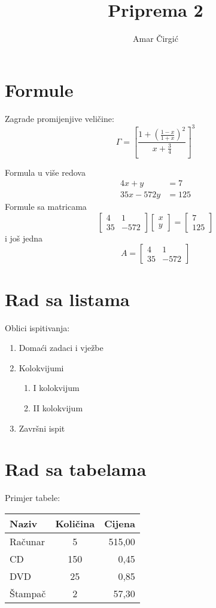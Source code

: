 \documentclass[12pt, twocolumn, a4paper]{article}
\begin{document}
\title{Priprema 2}
\author{Amar Čirgić}
\maketitle
\section{Formule}
Zagrade promijenjive veličine:
$$ \Gamma = \left[ \frac{1+\left( \frac{1-x}{1+x}\right)^2 }{x+\frac{3}{4}}\right]^3 $$

Formula u više redova
\begin{align}
4x+y &= 7 \nonumber \\ 
35x-572y &= 125 \nonumber
\end{align}
Formule sa matricama
$$
\begin{bmatrix}
	4 & 1 \\
	35 & -572
\end{bmatrix} 
\begin{bmatrix}
	x \\
	y
\end{bmatrix} 
=
\begin{bmatrix}
	7 \\
	125
\end{bmatrix}
$$
i još jedna
$$
A=
\begin{bmatrix}
	4 & 1 \\
	35 & -572 
\end{bmatrix}
$$

\section{Rad sa listama}
Oblici ispitivanja:
\begin{enumerate}
	\item Domaći zadaci i vježbe
	\item Kolokvijumi
		\begin{enumerate}
			\item I kolokvijum
			\item II kolokvijum
		\end{enumerate}
	\item Završni ispit
\end{enumerate}
\section{Rad sa tabelama}
Primjer tabele:
\begin{table}[h]
	\begin{tabular}{|l|c|r|}
		\hline
		Naziv & Količina & Cijena \\ 
		\hline 
		\hline
		Računar & 5 & 515,00 \\ \hline
		CD & 150 & 0,45 \\ \hline
		DVD & 25 & 0,85 \\ \hline
		Štampač & 2 & 57,30 \\ \hline 
	\end{tabular}
\end{table}
\end{document}
